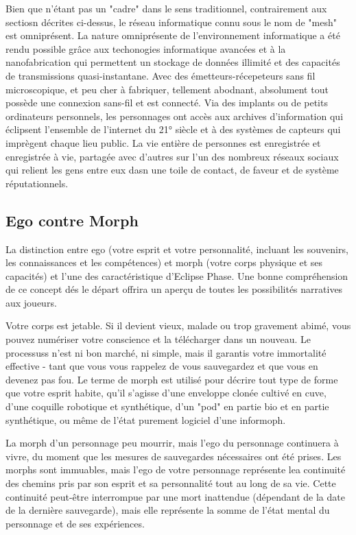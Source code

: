 Bien que n'étant pas un "cadre" dans le sens traditionnel, contrairement aux sectiosn décrites ci-dessus, le réseau informatique connu sous le nom de "mesh" est omniprésent. La nature omniprésente de l'environnement informatique a été rendu possible grâce aux techonogies informatique avancées et à la nanofabrication qui permettent un stockage de données illimité et des capacités de transmissions quasi-instantane. Avec des émetteurs-récepeteurs sans fil microscopique, et peu cher à fabriquer,  tellement abodnant, absolument tout possède une connexion sans-fil et est connecté. Via des implants ou de petits ordinateurs personnels, les personnages ont accès aux archives d'information qui éclipsent l'ensemble de l'internet du 21° siècle et à des systèmes de capteurs qui imprègent chaque lieu public. La vie entière de personnes est enregistrée et enregistrée à vie, partagée avec d'autres sur l'un des nombreux réseaux sociaux qui relient les gens entre eux dasn une toile de contact, de faveur et de système réputationnels. 



\subsection{Ego contre Morph} \label{sec:ego-vs.-morph} 

La distinction entre ego (votre esprit et votre personnalité, incluant les souvenirs, les connaissances et les compétences) et morph (votre corps physique et ses capacités) et l'une des caractéristique d'Eclipse Phase. Une bonne compréhension de ce concept dés le départ offrira un aperçu de toutes les possibilités narratives aux joueurs. 

Votre corps est jetable. Si il devient vieux, malade ou trop gravement abimé, vous pouvez numériser votre conscience et la télécharger dans un nouveau. Le processuss n'est ni bon marché, ni simple, mais il garantis votre immortalité effective - tant que vous vous rappelez de vous sauvegardez et que vous en devenez pas fou. Le terme de morph est utilisé pour décrire tout type de forme que votre esprit habite, qu'il s'agisse d'une enveloppe clonée cultivé en cuve, d'une coquille robotique et synthétique, d'un "pod" en partie bio et en partie synthétique, ou même de l'état purement logiciel d'une informoph. 

La morph d'un personnage peu mourrir, mais l'ego du personnage continuera à vivre, du moment que les mesures de sauvegardes nécessaires ont été prises. Les morphs sont immuables, mais l'ego de votre personnage représente lea continuité des chemins pris par son esprit et sa personnalité tout au long de sa vie. Cette continuité peut-être interrompue par une mort inattendue (dépendant de la date de la dernière sauvegarde), mais elle représente la somme de l'état mental du personnage et de ses expériences. 

